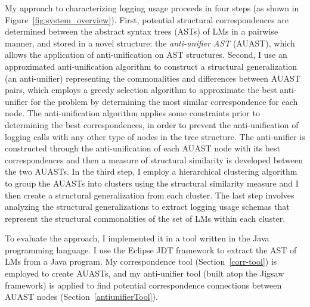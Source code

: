 My approach to characterizing logging usage proceeds in four steps (as shown in Figure~\ref{fig:system_overview}). First, potential structural correspondences are determined between the abstract syntax trees (ASTs) of LMs in a pairwise manner, and stored in a novel structure: the \emph{anti-unifier AST} (AUAST), which allows the application of anti-unification on AST structures. Second, I use an approximated anti-unification algorithm to construct a structural generalization (an anti-unifier) representing the commonalities and differences between AUAST pairs, which employs a greedy selection algorithm to approximate the best anti-unifier for the problem by determining the most similar correspondence for each node. The anti-unification algorithm applies some constraints prior to determining the best correspondences, in order to prevent the anti-unification of logging calls with any other type of nodes in the tree structure. The anti-unifier is constructed through the anti-unification of each AUAST node with its best correspondences and then a measure of structural similarity is developed between the two AUASTs. 
In the third step, I employ a hierarchical clustering algorithm to group the AUASTs into clusters using the structural similarity measure and I then create a structural generalization from each cluster. %
The last step involves analyzing the structural generalizations to extract logging usage schemas that represent the structural commonalities of the set of LMs within each cluster.

To evaluate the approach, I implemented it in a tool written in the Java programming language.  I use the Eclipse JDT framework to extract the AST of LMs from a Java program. My correspondence tool (Section~\ref{corr-tool}) is employed to create AUASTs, and my anti-unifier tool (built atop the Jigsaw framework) is applied to find potential correspondence connections between AUAST nodes (Section~\ref{antiunifierTool}).


